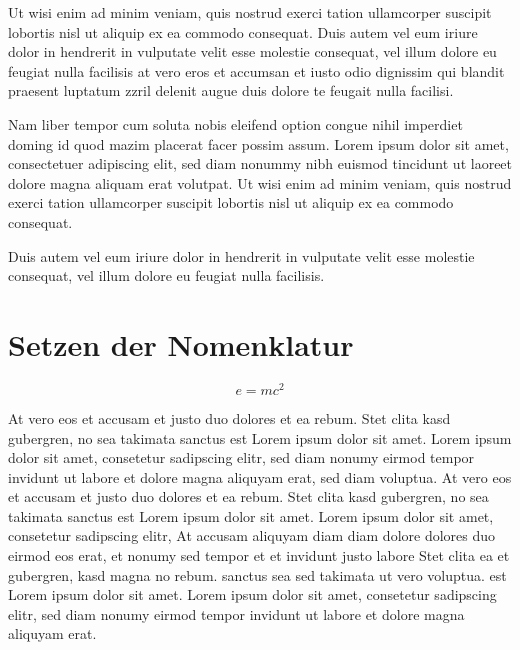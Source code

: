Ut wisi enim ad minim veniam, quis nostrud exerci tation ullamcorper suscipit lobortis nisl ut aliquip ex ea commodo consequat. Duis autem vel eum iriure dolor in hendrerit in vulputate velit esse molestie consequat, vel illum dolore eu feugiat nulla facilisis at vero eros et accumsan et iusto odio dignissim qui blandit praesent luptatum zzril delenit augue duis dolore te feugait nulla facilisi.   

Nam liber tempor cum soluta nobis eleifend option congue nihil imperdiet doming id quod mazim placerat facer possim assum. Lorem ipsum dolor sit amet, consectetuer adipiscing elit, sed diam nonummy nibh euismod tincidunt ut laoreet dolore magna aliquam erat volutpat. Ut wisi enim ad minim veniam, quis nostrud exerci tation ullamcorper suscipit lobortis nisl ut aliquip ex ea commodo consequat.   

Duis autem vel eum iriure dolor in hendrerit in vulputate velit esse molestie consequat, vel illum dolore eu feugiat nulla facilisis.   

\section{Setzen der Nomenklatur} \label{sec:nomencl}

\begin{equation}
e=mc^2
\label{eq:eq1}
\end{equation}


At vero eos et accusam et justo duo dolores et ea rebum. Stet clita kasd gubergren, no sea takimata sanctus est Lorem ipsum dolor sit amet. Lorem ipsum dolor sit amet, consetetur sadipscing elitr, sed diam nonumy eirmod tempor invidunt ut labore et dolore magna aliquyam erat, sed diam voluptua. At vero eos et accusam et justo duo dolores et ea rebum. Stet clita kasd gubergren, no sea takimata sanctus est Lorem ipsum dolor sit amet. Lorem ipsum dolor sit amet, consetetur sadipscing elitr, At accusam aliquyam diam diam dolore dolores duo eirmod eos erat, et nonumy sed tempor et et invidunt justo labore Stet clita ea et gubergren, kasd magna no rebum. sanctus sea sed takimata ut vero voluptua. est Lorem ipsum dolor sit amet. Lorem ipsum dolor sit amet, consetetur sadipscing elitr, sed diam nonumy eirmod tempor invidunt ut labore et dolore magna aliquyam erat.   

